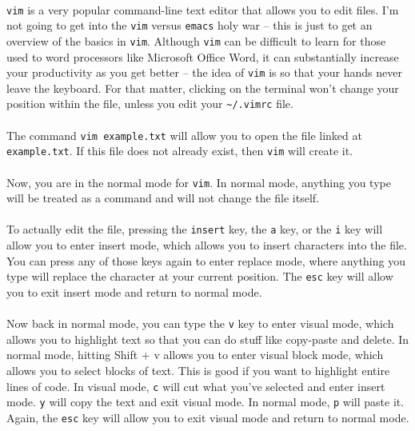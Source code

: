 \documentclass{article}
\begin{document}
\paragraph{} \texttt{vim} is a very popular command-line text editor that allows you to edit files. I'm not going to get into the \texttt{vim} versus \texttt{emacs} holy war -- this is just to get an overview of the basics in \texttt{vim}. Although \texttt{vim} can be difficult to learn for those used to word processors like Microsoft Office Word, it can substantially increase your productivity as you get better -- the idea of \texttt{vim} is so that your hands never leave the keyboard. For that matter, clicking on the terminal won't change your position within the file, unless you edit your \texttt{\~\//.vimrc} file.

\paragraph{} The command \texttt{vim example.txt} will allow you to open the file linked at \texttt{example.txt}. If this file does not already exist, then \texttt{vim} will create it.

\paragraph{} Now, you are in the normal mode for \texttt{vim}. In normal mode, anything you type will be treated as a command and will not change the file itself.

\paragraph{} To actually edit the file, pressing the \texttt{insert} key, the \texttt{a} key, or the \texttt{i} key will allow you to enter insert mode, which allows you to insert characters into the file. You can press any of those keys again to enter replace mode, where anything you type will replace the character at your current position. The \texttt{esc} key will allow you to exit insert mode and return to normal mode.

\paragraph{} Now back in normal mode, you can type the \texttt{v} key to enter visual mode, which allows you to highlight text so that you can do stuff like copy-paste and delete. In normal mode, hitting Shift + v allows you to enter visual block mode, which allows you to select blocks of text. This is good if you want to highlight entire lines of code. In visual mode, \texttt{c} will cut what you've selected and enter insert mode. \texttt{y} will copy the text and exit visual mode. In normal mode, \texttt{p} will paste it. Again, the \texttt{esc} key will allow you to exit visual mode and return to normal mode.
\end{document}
